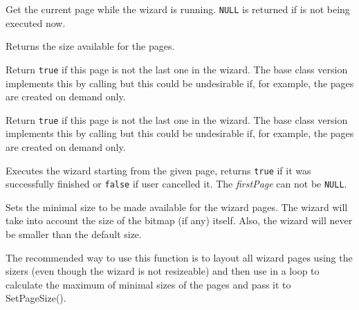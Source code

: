 Get the current page while the wizard is running. {\tt NULL} is returned if 
 is not being executed now.

\label{wxwizardgetpagesize}


Returns the size available for the pages.

\label{wxwizardhasnextpage}


Return {\tt true} if this page is not the last one in the wizard. The base
class version implements this by calling 
 but this could be undesirable if,
for example, the pages are created on demand only.



\label{wxwizardhasprevpage}


Return {\tt true} if this page is not the last one in the wizard. The base
class version implements this by calling 
 but this could be undesirable if,
for example, the pages are created on demand only.



\label{wxwizardrunwizard}


Executes the wizard starting from the given page, returns {\tt true} if it was
successfully finished or {\tt false} if user cancelled it. The {\it firstPage} 
can not be {\tt NULL}.

\label{wxwizardsetpagesize}


Sets the minimal size to be made available for the wizard pages. The wizard
will take into account the size of the bitmap (if any) itself. Also, the
wizard will never be smaller than the default size.

The recommended way to use this function is to layout all wizard pages using
the sizers (even though the wizard is not resizeable) and then use 
 in a loop to calculate the maximum
of minimal sizes of the pages and pass it to SetPageSize().

